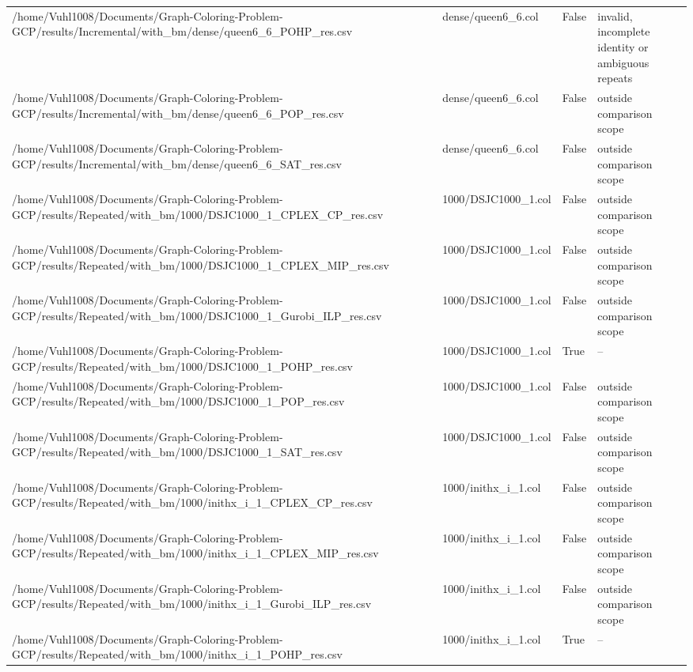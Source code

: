 \begin{table}[htbp]
\begin{tabular}{llll}
/home/Vuhl1008/Documents/Graph-Coloring-Problem-GCP/results/Incremental/with\_bm/dense/queen6\_6\_POHP\_res.csv & dense/queen6\_6.col & False & invalid, incomplete identity or ambiguous repeats \\
/home/Vuhl1008/Documents/Graph-Coloring-Problem-GCP/results/Incremental/with\_bm/dense/queen6\_6\_POP\_res.csv & dense/queen6\_6.col & False & outside comparison scope \\
/home/Vuhl1008/Documents/Graph-Coloring-Problem-GCP/results/Incremental/with\_bm/dense/queen6\_6\_SAT\_res.csv & dense/queen6\_6.col & False & outside comparison scope \\
/home/Vuhl1008/Documents/Graph-Coloring-Problem-GCP/results/Repeated/with\_bm/1000/DSJC1000\_1\_CPLEX\_CP\_res.csv & 1000/DSJC1000\_1.col & False & outside comparison scope \\
/home/Vuhl1008/Documents/Graph-Coloring-Problem-GCP/results/Repeated/with\_bm/1000/DSJC1000\_1\_CPLEX\_MIP\_res.csv & 1000/DSJC1000\_1.col & False & outside comparison scope \\
/home/Vuhl1008/Documents/Graph-Coloring-Problem-GCP/results/Repeated/with\_bm/1000/DSJC1000\_1\_Gurobi\_ILP\_res.csv & 1000/DSJC1000\_1.col & False & outside comparison scope \\
/home/Vuhl1008/Documents/Graph-Coloring-Problem-GCP/results/Repeated/with\_bm/1000/DSJC1000\_1\_POHP\_res.csv & 1000/DSJC1000\_1.col & True & -- \\
/home/Vuhl1008/Documents/Graph-Coloring-Problem-GCP/results/Repeated/with\_bm/1000/DSJC1000\_1\_POP\_res.csv & 1000/DSJC1000\_1.col & False & outside comparison scope \\
/home/Vuhl1008/Documents/Graph-Coloring-Problem-GCP/results/Repeated/with\_bm/1000/DSJC1000\_1\_SAT\_res.csv & 1000/DSJC1000\_1.col & False & outside comparison scope \\
/home/Vuhl1008/Documents/Graph-Coloring-Problem-GCP/results/Repeated/with\_bm/1000/inithx\_i\_1\_CPLEX\_CP\_res.csv & 1000/inithx\_i\_1.col & False & outside comparison scope \\
/home/Vuhl1008/Documents/Graph-Coloring-Problem-GCP/results/Repeated/with\_bm/1000/inithx\_i\_1\_CPLEX\_MIP\_res.csv & 1000/inithx\_i\_1.col & False & outside comparison scope \\
/home/Vuhl1008/Documents/Graph-Coloring-Problem-GCP/results/Repeated/with\_bm/1000/inithx\_i\_1\_Gurobi\_ILP\_res.csv & 1000/inithx\_i\_1.col & False & outside comparison scope \\
/home/Vuhl1008/Documents/Graph-Coloring-Problem-GCP/results/Repeated/with\_bm/1000/inithx\_i\_1\_POHP\_res.csv & 1000/inithx\_i\_1.col & True & -- \\

\end{tabular}
\end{table}
